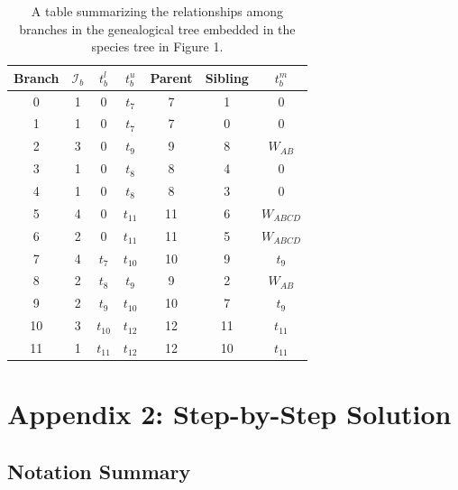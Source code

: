 \documentclass[11pt]{article}
\begin{document}
\begin{table}[h]
\centering
\caption{\label{tab:table-2} 
	A table summarizing the relationships among branches in the genealogical tree embedded in the species tree in Figure 1. 
}
\begin{tabular}[t]{ |c|c|c|c|c|c|c| }
	\toprule
	Branch & $\mathcal{I}_b$ & $t_b^l$ & $t_b^u$ & Parent & Sibling & $t_b^m$ \\
	\midrule
	0  &  1 & 0      & $t_7$  & 7  & 1  & 0          \\
	1  &  1 & 0      & $t_7$  & 7  & 0  & 0          \\
	2  &  3 & 0      & $t_9$  & 9  & 8  & $W_{AB}$   \\
	3  &  1 & 0      & $t_8$  & 8  & 4  & 0          \\
	4  &  1 & 0      & $t_8$  & 8  & 3  & 0          \\
	5  &  4 & 0      & $t_{11}$ & 11 & 6  & $W_{ABCD}$ \\
	6  &  2 & 0      & $t_{11}$ & 11 & 5  & $W_{ABCD}$ \\
	7  &  4 & $t_7$  & $t_{10}$ & 10 & 9  & $t_9$      \\
	8  &  2 & $t_8$  & $t_9$  & 9  & 2  & $W_{AB}$   \\
	9  &  2 & $t_9$  & $t_{10}$ & 10 & 7  & $t_9$      \\
	10 &  3 & $t_{10}$ & $t_{12}$ & 12 & 11 & $t_{11}$     \\
	11 &  1 & $t_{11}$ & $t_{12}$ & 12 & 10 & $t_{11}$     \\
	\bottomrule
\end{tabular}
\end{table}

\section{Appendix 2: Step-by-Step Solution}


\subsection{Notation Summary}
\end{document}
